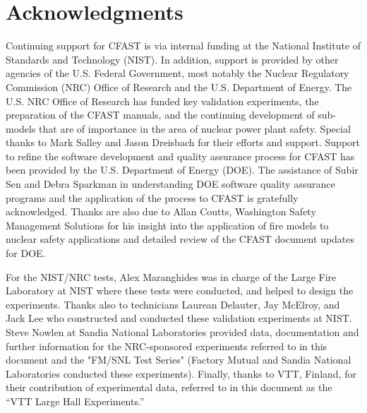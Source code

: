 \documentclass[12pt]{book}
\begin{document}
\chapter{Acknowledgments}

\label{acksection}

Continuing support for CFAST is via internal funding at the National Institute of Standards and Technology (NIST). In addition, support is provided by other agencies of the U.S. Federal Government, most notably the Nuclear Regulatory Commission (NRC) Office of Research and the U.S. Department of Energy. The U.S. NRC Office of Research has funded key validation experiments, the preparation
of the CFAST manuals, and the continuing development of sub-models that are of importance in the area of nuclear power plant safety. Special thanks to Mark Salley and Jason Dreisbach for their efforts and support. Support to refine the software development and quality assurance process for CFAST has been provided by the U.S. Department of Energy (DOE). The assistance of Subir Sen and Debra Sparkman in understanding DOE software quality assurance programs and the application of the process to CFAST is gratefully acknowledged.  Thanks are also due to Allan Coutts, Washington Safety Management Solutions for his insight into the application of fire models to nuclear safety applications and detailed review of the CFAST document updates for DOE.

For the NIST/NRC tests, Alex Maranghides was in charge of the Large Fire Laboratory at NIST where these tests were conducted, and helped to design the experiments. Thanks also to technicians Laurean Delauter, Jay McElroy, and Jack Lee who constructed and conducted these validation experiments at NIST. Steve Nowlen at Sandia National Laboratories provided data, documentation and further information for the NRC-sponsored experiments referred to in this document and the "FM/SNL Test Series" (Factory Mutual and Sandia National Laboratories conducted these experiments). Finally, thanks to VTT, Finland, for their contribution of experimental data, referred to in this document as the ``VTT Large Hall Experiments.''

\tableofcontents

\listoffigures

\listoftables

\mainmatter








%









\appendix
{}




\end{document}

